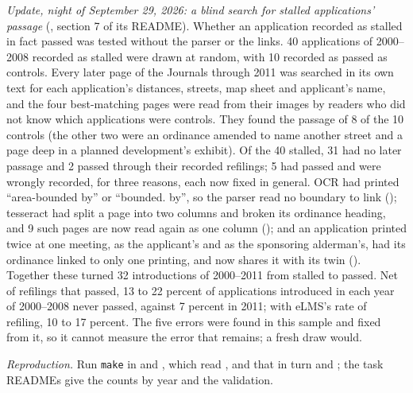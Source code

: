 \textit{Update, night of September 29, 2026: a blind search for stalled applications' passage}
(, section 7 of its README). Whether an application recorded as stalled in
fact passed was tested without the parser or the links. 40 applications of 2000--2008 recorded as stalled were drawn
at random, with 10 recorded as passed as controls. Every later page of the Journals through 2011 was searched in its
own text for each application's distances, streets, map sheet and applicant's name, and the four best-matching pages
were read from their images by readers who did not know which applications were controls. They found the passage of 8
of the 10 controls (the other two were an ordinance amended to name another street and a page deep in a planned
development's exhibit). Of the 40 stalled, 31 had no later passage and 2 passed through their recorded refilings; 5
had passed and were wrongly recorded, for three reasons, each now fixed in general. OCR had printed ``area-bounded
by'' or ``bounded. by'', so the parser read no boundary to link ();
tesseract had split a page into two columns and broken its ordinance heading, and 9 such pages are now read again as
one column (); and an application printed twice at one meeting, as the
applicant's and as the sponsoring alderman's, had its ordinance linked to only one printing, and now shares it with
its twin (). Together these turned 32 introductions of 2000--2011 from
stalled to passed. Net of refilings that passed, 13 to 22 percent of applications introduced in each year of
2000--2008 never passed, against 7 percent in 2011; with eLMS's rate of refiling, 10 to 17 percent. The five errors
were found in this sample and fixed from it, so it cannot measure the error that remains; a fresh draw would.

\textit{Reproduction.} Run \texttt{make} in  and
, which read , and that in
turn  and ; the task READMEs give
the counts by year and the validation.
